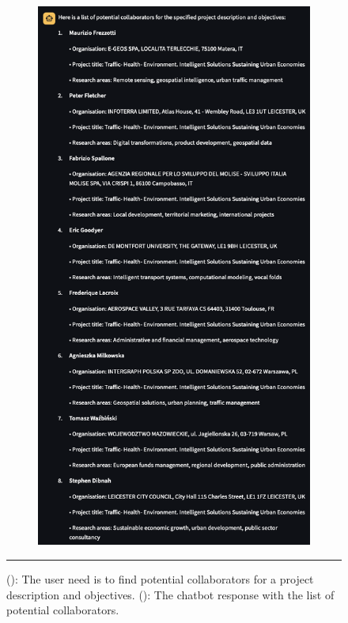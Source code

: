 \begin{figure}[h]
\begin{subfigure}{0.45\textwidth}
        \includegraphics[width=.6\textwidth]{figures/implementation/example-collaborators-recommendation-answer.png}
        \caption{}
        \label{fig:example-collaborators-answer}
    \end{subfigure}
    \rule{35em}{0.5pt}
    \caption{(): The user need is to find potential collaborators for a project description and objectives.
    (): The chatbot response with the list of potential collaborators.}
    \label{fig:example-collaborators-recommendation}
\end{figure}

